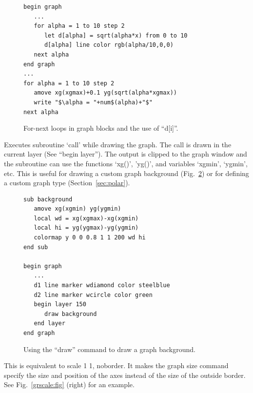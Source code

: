 \begin{commanddescription}
\begin{figure}[tb]
\begin{minipage}[c]{9.2cm}
\begin{Verbatim}
begin graph
   ...
   for alpha = 1 to 10 step 2
      let d[alpha] = sqrt(alpha*x) from 0 to 10
      d[alpha] line color rgb(alpha/10,0,0)
   next alpha
end graph
...
for alpha = 1 to 10 step 2
   amove xg(xgmax)+0.1 yg(sqrt(alpha*xgmax))
   write "$\alpha = "+num$(alpha)+"$"
next alpha
\end{Verbatim}
\end{minipage}
\hfill
\begin{minipage}[c]{7cm}
\mbox{}
\end{minipage}
\caption{\label{fig:sqroot}For-next loops in graph blocks and the use of ``d[i]''.}
\end{figure}

\item[{\sf draw call}]
\label{cmd:gdraw}

Executes subroutine `call' while drawing the graph. The call is drawn in the current layer (See ``begin layer''). The output is clipped to the graph window and the subroutine can use the functions `xg()', 'yg()', and variables `xgmin', `ygmin', etc. This is useful for drawing a custom graph background (Fig.~\ref{fig:shadow}) or for defining a custom graph type (Section~\ref{sec:polar}).

\begin{figure}[tb]
\begin{minipage}[c]{9.2cm}
\begin{Verbatim}
sub background
   amove xg(xgmin) yg(ygmin)
   local wd = xg(xgmax)-xg(xgmin)
   local hi = yg(ygmax)-yg(ygmin)
   colormap y 0 0 0.8 1 1 200 wd hi
end sub

begin graph
   ...
   d1 line marker wdiamond color steelblue
   d2 line marker wcircle color green
   begin layer 150
      draw background
   end layer
end graph
\end{Verbatim}
\end{minipage}
\hfill
\begin{minipage}[c]{7cm}
\mbox{}
\end{minipage}
\caption{\label{fig:shadow}Using the ``draw'' command to draw a graph background.}
\end{figure}

\item[{\sf fullsize } ]
This is equivalent to {\sf scale 1 1, noborder}. It makes the graph {\sf size} command specify the size and position of the axes instead of the size of the outside border. See Fig.~\ref{grscale:fig} (right) for an example.


\end{commanddescription}
